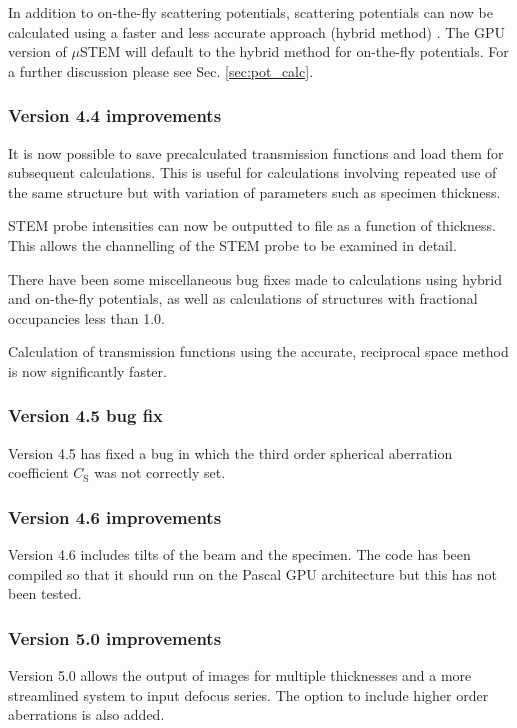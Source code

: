 \documentclass[12pt,a4paper]{article}
\begin{document}
In addition to on-the-fly scattering potentials, scattering potentials can now be calculated using a faster and less accurate approach (hybrid method) \cite{VDB}.
The GPU version of $\mu$STEM will default to the hybrid method for on-the-fly potentials.
For a further discussion please see Sec. \ref{sec:pot_calc}. 

\subsubsection{Version 4.4 improvements}

It is now possible to save precalculated transmission functions and load them for subsequent calculations.
This is useful for calculations involving repeated use of the same structure but with variation of parameters such as specimen thickness.

STEM probe intensities can now be outputted to file as a function of thickness.
This allows the channelling of the STEM probe to be examined in detail.

There have been some miscellaneous bug fixes made to calculations using hybrid and on-the-fly potentials, as well as calculations of structures with fractional occupancies less than 1.0.

Calculation of transmission functions using the accurate, reciprocal space method is now significantly faster.

\subsubsection{Version 4.5 bug fix}

Version 4.5 has fixed a bug in which the third order spherical aberration coefficient $C_\text{S}$ was not correctly set.

\subsubsection{Version 4.6 improvements}

Version 4.6 includes tilts of the beam and the specimen. The code has been compiled so that it should run on the Pascal GPU architecture but this has not been tested.

\subsubsection{Version 5.0 improvements}

Version 5.0 allows the output of images for multiple thicknesses and a more streamlined system to input defocus series. The option to include higher order aberrations is also added.
\end{document}
